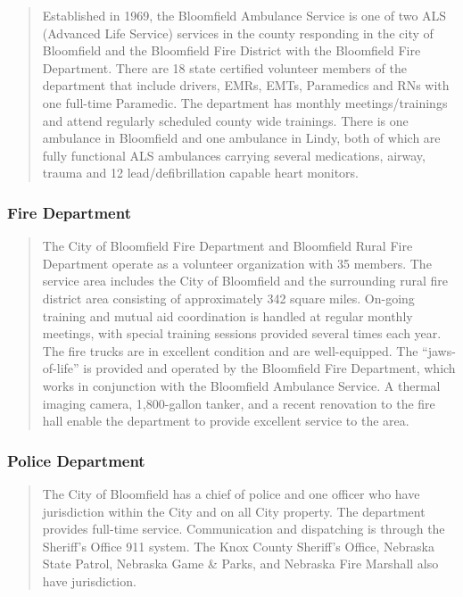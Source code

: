\begin{quote}
    Established in 1969, the Bloomfield Ambulance Service is one of two ALS (Advanced Life Service) services in the county responding in the city of Bloomfield and the Bloomfield Fire District with the Bloomfield Fire Department. There are 18 state certified volunteer members of the department that include drivers, EMRs, EMTs, Paramedics and RNs with one full-time Paramedic. The department has monthly meetings/trainings and attend regularly scheduled county wide trainings. There is one ambulance in Bloomfield and one ambulance in Lindy, both of which are fully functional ALS ambulances carrying several medications, airway, trauma and 12 lead/defibrillation capable heart monitors.
\end{quote}

\subsubsection*{Fire Department}

\begin{quote}
    The City of Bloomfield Fire Department and Bloomfield Rural Fire Department operate as a volunteer organization with 35 members. The service area includes the City of Bloomfield and the surrounding rural fire district area consisting of approximately 342 square miles. On-going training and mutual aid coordination is handled at regular monthly meetings, with special training sessions provided several times each year. The fire trucks are in excellent condition and are well-equipped. The “jaws-of-life” is provided and operated by the Bloomfield Fire Department, which works in conjunction with the Bloomfield Ambulance Service. A thermal imaging camera, 1,800-gallon tanker, and a recent renovation to the fire hall enable the department to provide excellent service to the area.
\end{quote}

\subsubsection*{Police Department}

\begin{quote}
    The City of Bloomfield has a chief of police and one officer who have jurisdiction within the City and on all City property. The department provides full-time service. Communication and dispatching is through the Sheriff’s Office 911 system. The Knox County Sheriff’s Office, Nebraska State Patrol, Nebraska Game \& Parks, and Nebraska Fire Marshall also have jurisdiction.
\end{quote}

